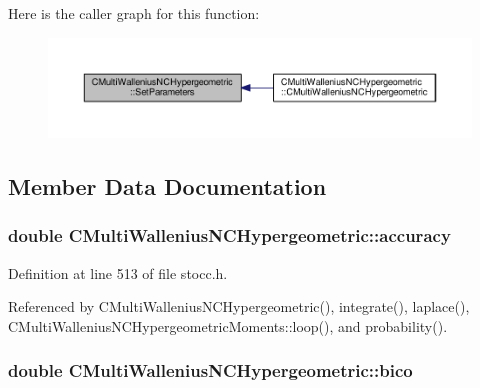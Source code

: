 Here is the caller graph for this function\-:\nopagebreak
\begin{figure}[H]
\begin{center}
\leavevmode
\includegraphics[width=350pt]{class_c_multi_wallenius_n_c_hypergeometric_a81121986299435e7b49d6c8c421c2089_icgraph}
\end{center}
\end{figure}




\subsection{Member Data Documentation}
\subsubsection[{accuracy}]{\setlength{\rightskip}{0pt plus 5cm}double C\-Multi\-Wallenius\-N\-C\-Hypergeometric\-::accuracy\hspace{0.3cm}{\ttfamily [protected]}}\label{class_c_multi_wallenius_n_c_hypergeometric_a16d888f26a077718fcf2ec88aabfae9e}


Definition at line 513 of file stocc.\-h.



Referenced by C\-Multi\-Wallenius\-N\-C\-Hypergeometric(), integrate(), laplace(), C\-Multi\-Wallenius\-N\-C\-Hypergeometric\-Moments\-::loop(), and probability().

\subsubsection[{bico}]{\setlength{\rightskip}{0pt plus 5cm}double C\-Multi\-Wallenius\-N\-C\-Hypergeometric\-::bico\hspace{0.3cm}{\ttfamily [protected]}}\label{class_c_multi_wallenius_n_c_hypergeometric_a028eb3d5401aad53671ae6850838fcc0}


